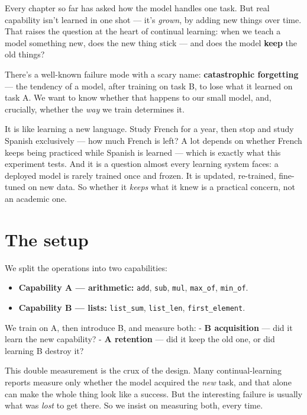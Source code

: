 Every chapter so far has asked how the model handles one task. But real
capability isn't learned in one shot --- it's \emph{grown}, by adding
new things over time. That raises the question at the heart of continual
learning: when we teach a model something new, does the new thing stick
--- and does the model \textbf{keep} the old things?

There's a well-known failure mode with a scary name:
\textbf{catastrophic forgetting} --- the tendency of a model, after
training on task B, to lose what it learned on task A. We want to know
whether that happens to our small model, and, crucially, whether the
\emph{way} we train determines it.

It is like learning a new language. Study French for a year, then stop
and study Spanish exclusively --- how much French is left? A lot depends
on whether French keeps being practiced while Spanish is learned ---
which is exactly what this experiment tests. And it is a question almost
every learning system faces: a deployed model is rarely trained once and
frozen. It is updated, re-trained, fine-tuned on new data. So whether it
\emph{keeps} what it knew is a practical concern, not an academic one.

\section{The setup}\label{the-setup}

We split the operations into two capabilities:

\begin{itemize}
\tightlist
\item
  \textbf{Capability A --- arithmetic:} \texttt{add}, \texttt{sub},
  \texttt{mul}, \texttt{max\_of}, \texttt{min\_of}.
\item
  \textbf{Capability B --- lists:} \texttt{list\_sum},
  \texttt{list\_len}, \texttt{first\_element}.
\end{itemize}

We train on A, then introduce B, and measure both: - \textbf{B
acquisition} --- did it learn the new capability? - \textbf{A retention}
--- did it keep the old one, or did learning B destroy it?

This double measurement is the crux of the design. Many
continual-learning reports measure only whether the model acquired the
\emph{new} task, and that alone can make the whole thing look like a
success. But the interesting failure is usually what was \emph{lost} to
get there. So we insist on measuring both, every time.

